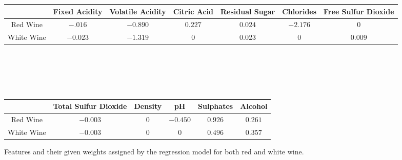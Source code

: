\begin{figure*}[htb]

  \begin{tabular}{|c|c|c|c|c|c|c|} 
    \hline
     & Fixed Acidity & Volatile Acidity & Citric Acid & Residual Sugar & Chlorides & Free Sulfur Dioxide\\
    \hline
    Red Wine & $-.016$ & $-0.890$ & $0.227$ & $0.024$ & $-2.176$ & $0$\\
    White Wine & $-0.023$ & $-1.319$ &  $0$ & $0.023$ & $0$ & $0.009$ \\
    \hline
  \end{tabular}
 \\\\\\\
\begin{tabular}{|c|c|c|c|c|c|} 
    \hline
     & Total Sulfur Dioxide & Density & pH & Sulphates & Alcohol\\
    \hline
    Red Wine & $-0.003$ & $0$ & $-0.450$ & $0.926$ & $0.261$\\
    White Wine & $-0.003$ & $0$ & $0$ & $0.496$ & $0.357$ \\
    \hline
 \end{tabular}

  \caption{Features and their given weights assigned by the regression model for both red and white wine.}
  \label{tab:coeff}

\end{figure*}

